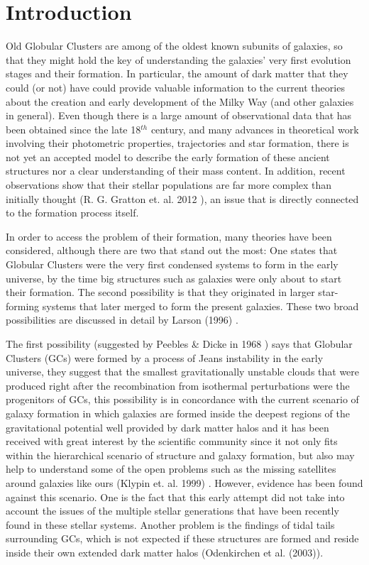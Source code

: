 \chapter{Introduction}

Old Globular Clusters are among of the oldest known subunits of galaxies, so that they might hold the key of understanding the galaxies' very first evolution stages and their formation. In particular, the amount of dark matter that they could (or not) have could provide valuable information to the current theories about the creation and early development of the Milky Way (and other galaxies in general). Even though there is a large amount of observational data that has been obtained since the late 18$^{th}$ century, and many advances in theoretical work involving their photometric properties, trajectories and star formation, there is not yet an accepted model to describe the early formation of these ancient structures nor a clear understanding of their mass content. In addition, recent observations show that their stellar populations are far more complex than initially thought (R. G. Gratton et. al. 2012 \cite{8}), an issue that is directly connected to the formation process itself. 

In order to access the problem of their formation, many theories have been considered, although there are two that stand out the most: One states that Globular Clusters were the very first condensed systems to form in the early universe, by the time big structures such as galaxies were only about to start their formation. The second possibility is that they originated in larger star-forming systems that later merged to form the present galaxies. These two broad possibilities are discussed in detail by Larson (1996) \cite{9}.

The first possibility (suggested by Peebles \& Dicke in 1968 \citep{7}) says that Globular Clusters (GCs) were formed by a process of Jeans instability in the early universe, they suggest that the smallest gravitationally unstable clouds that were produced right after the recombination from isothermal perturbations were the progenitors of GCs, this possibility is in concordance with the current scenario of galaxy formation in which galaxies are formed inside the deepest regions of the gravitational potential well provided by dark matter halos and it has been received with great interest by the scientific community since it not only fits within the hierarchical scenario of structure and galaxy formation, but also may help to understand some of the open problems such as the missing satellites around galaxies like ours (Klypin et. al. 1999) \cite{11}. However, evidence has been found against this scenario. One is the fact that this early attempt did not take into account the issues of the multiple stellar generations that have been recently found in these stellar systems. Another problem is the findings of tidal tails surrounding GCs, which is not expected if these structures are formed and reside inside their own extended dark matter halos (Odenkirchen et al. (2003))\cite{12}.

